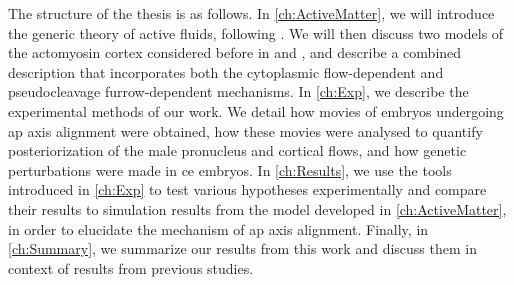The structure of the thesis is as follows. In \autoref{ch:ActiveMatter}, we will introduce the generic theory of active fluids, following \cite{julicher2018hydrodynamic,de2013non}. We will then discuss two models of the actomyosin cortex considered before in \cite{gross2019guiding} and \cite{reymann2016cortical}, and describe a combined description that incorporates both the cytoplasmic flow-dependent and pseudocleavage furrow-dependent mechanisms. In \autoref{ch:Exp}, we describe the experimental methods of our work. We detail how movies of embryos undergoing \ac{ap} axis alignment were obtained, how these movies were analysed to quantify posteriorization of the male pronucleus and cortical flows, and how genetic perturbations were made in \ac{ce} embryos. In \autoref{ch:Results}, we use the tools introduced in \autoref{ch:Exp} to test various hypotheses experimentally and compare their results to simulation results from the model developed in \autoref{ch:ActiveMatter}, in order to elucidate the mechanism of \ac{ap} axis alignment. Finally, in \autoref{ch:Summary}, we summarize our results from this work and discuss them in context of results from previous studies. 